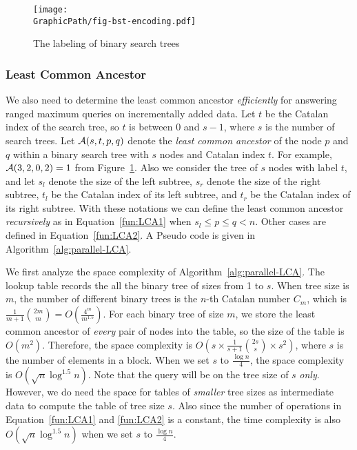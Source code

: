 \begin{figure}[!thb]
  \centering
  \texttt{[image: \\GraphicPath/fig-bst-encoding.pdf]}
  \caption{The labeling of binary search trees}
  \label{fig:labelingBST}
\end{figure}

\subsubsection{Least Common Ancestor}


We also need to determine the least common ancestor {\em efficiently}
for answering ranged maximum queries on incrementally added data.  Let
$t$ be the Catalan index of the search tree, so $t$ is between 0 and
$s - 1$, where $s$ is the number of search trees.  Let ${\cal A}(s, t,
p, q)$ denote the {\em least common ancestor} of the node $p$ and $q$
within a binary search tree with $s$ nodes and Catalan index $t$.  For
example, ${\cal A}(3, 2, 0, 2) = 1$ from Figure~\ref{fig:labelingBST}.
Also we consider the tree of $s$ nodes with label $t$, and let $s_l$
denote the size of the left subtree, $s_r$ denote the size of the
right subtree, $t_l$ be the Catalan index of its left subtree, and
$t_r$ be the Catalan index of its right subtree.  With these notations
we can define the least common ancestor {\em recursively} as in
Equation~\ref{fun:LCA1} when $s_l \le p \le q < n$.  Other cases are
defined in Equation~\ref{fun:LCA2}.  A Pseudo code is given in
Algorithm~\ref{alg:parallel-LCA}.





We first analyze the space complexity of
Algorithm~\ref{alg:parallel-LCA}.  The lookup table records the all
the binary tree of sizes from 1 to $s$.  When tree size is $m$, the
number of different binary trees is the $n$-th Catalan number $C_m$,
which is $\frac{1}{m+1}\binom{2m}{m} = O(\frac{4^m}{m^{1.5}})$.  For
each binary tree of size $m$, we store the least common ancestor of
{\em every} pair of nodes into the table, so the size of the table is
$O(m^2)$.  Therefore, the space complexity is $O(s \times
\frac{1}{s+1}\binom{2s}{s} \times s^2)$, where $s$ is the number of
elements in a block.  When we set $s$ to $\frac{\log n}{4}$, the space
complexity is $O(\sqrt{n} \log ^{1.5} n)$.  Note that the query will
be on the tree size of $s$ {\em only}.  However, we do need the space
for tables of {\em smaller} tree sizes as intermediate data to compute
the table of tree size $s$.  Also since the number of operations in
Equation~\ref{fun:LCA1} and \ref{fun:LCA2} is a constant, the time
complexity is also $O(\sqrt{n} \log ^{1.5} n)$ when we set $s$ to
$\frac{\log n}{4}$.

